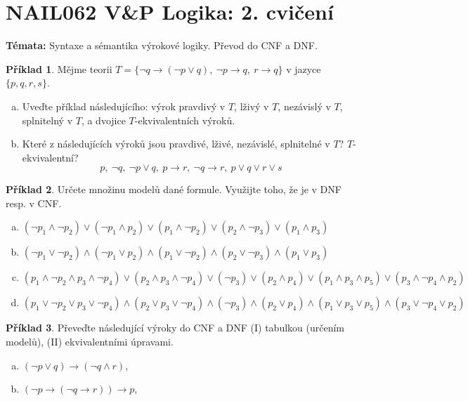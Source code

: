 \documentclass[a4paper]{article}
\theoremstyle{definition}
\newtheorem{problem}{Příklad}
\begin{document}
\section*{NAIL062 V\&P Logika: 2. cvičení}


\textbf{Témata:} 
Syntaxe a sémantika výrokové logiky. Převod do CNF a DNF.

\medskip\begin{problem}
    Mějme teorii $T=\{\neg q \to (\neg p \vee q),\ \neg p \to q,\ r \to q\}$ v jazyce $\{p, q, r, s\}$.
    \begin{enumerate}[(a)]
        \item Uveďte příklad následujícího: výrok pravdivý v $T$, lživý v $T$, nezávislý v $T$, splnitelný v $T$, a dvojice $T$-ekvivalentních výroků.
        \item Které z následujících výroků jsou pravdivé, lživé, nezávislé, splnitelné v $T$? $T$-ekvivalentní? 
        $$
        p, \ \neg q, \ \neg p\vee q, \ p\to r,\ \neg q\to r, \ p\vee q\vee r\vee s
        $$


    \end{enumerate}
\end{problem}
    
    
\medskip\begin{problem} Určete množinu modelů dané formule. Využijte toho, že je v DNF resp. v CNF.
\begin{enumerate}[(a)]
    \item $(\neg p_1 \wedge \neg p_2)\vee( \neg p_1 \wedge p_2)\vee( p_1 \wedge \neg p_2)\vee( p_2 \wedge \neg p_3)\vee( p_1 \wedge p_3)$
    \item $(\neg p_1 \vee \neg p_2)\wedge( \neg p_1 \vee p_2)\wedge( p_1 \vee \neg p_2)\wedge( p_2 \vee \neg p_3)\wedge( p_1 \vee p_3)$
    \item $(p_1 \wedge  \neg p_2 \wedge  p_3 \wedge  \neg p_4 )\vee(p_2 \wedge  p_3 \wedge  \neg p_4 )\vee(\neg p_3)\vee(p_2 \wedge  p_4)\vee(p_1 \wedge  p_3 \wedge  p_5 )\vee(p_3 \wedge  \neg p_4 \wedge  p_2 )$
    \item $(p_1 \vee \neg p_2 \vee p_3 \vee \neg p_4 )\wedge(p_2 \vee p_3 \vee \neg p_4 )\wedge(\neg p_3)\wedge(p_2 \vee p_4)\wedge(p_1 \vee p_3 \vee p_5 )\wedge(p_3 \vee \neg p_4 \vee p_2 )$
\end{enumerate}
\end{problem}
    
    
\medskip\begin{problem} Převeďte následující výroky do CNF a DNF (I) tabulkou (určením modelů), (II) ekvivalentními úpravami.
\begin{enumerate}[(a)]
    \item $(\neg p \vee q)\to (\neg q \wedge r)$,
    \item $(\neg p \to (\neg q \to r))\to p$,
\end{enumerate}
\end{problem}
    
\end{document}
